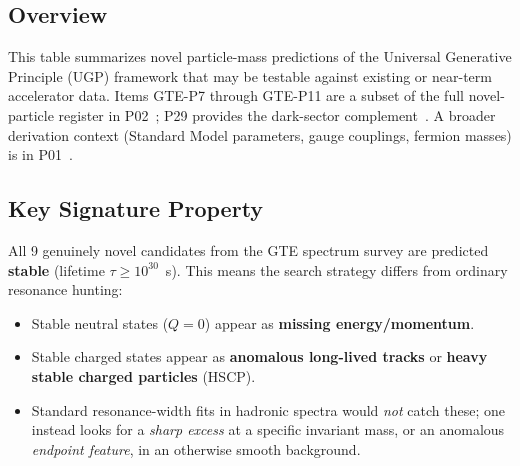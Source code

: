 

\makeatletter
{}
\makeatother

\newcommand{\tOne}{\textcolor{tier1}{\textbf{Tier~1}}}
\newcommand{\tTwo}{\textcolor{tier2}{\textbf{Tier~2}}}
\newcommand{\tThree}{\textcolor{tier3}{\textbf{Tier~3}}}
\providecommand{\MeV}{\,\mathrm{MeV}}
\providecommand{\GeV}{\,\mathrm{GeV}}

\subsection*{Overview}

This table summarizes novel particle-mass predictions of the Universal Generative
Principle (UGP) framework that may be testable against existing or near-term
accelerator data.
Items GTE-P7 through GTE-P11 are a subset of the full novel-particle register in
P02~\cite{SpivackGTESpectrum}; P29 provides the dark-sector complement~\cite{SpivackMirrorBraidAtlas}.
A broader derivation context (Standard Model parameters, gauge couplings, fermion
masses) is in P01~\cite{SpivackSM}.

\subsection*{Key Signature Property}

All 9 genuinely novel candidates from the GTE spectrum survey are predicted
\textbf{stable} (lifetime $\tau \geq 10^{30}$~s).  This means the
search strategy differs from ordinary resonance hunting:

\begin{itemize}[leftmargin=2em,itemsep=2pt]
  \item Stable neutral states ($Q=0$) appear as \textbf{missing energy/momentum}.
  \item Stable charged states appear as \textbf{anomalous long-lived tracks} or
        \textbf{heavy stable charged particles} (HSCP).
  \item Standard resonance-width fits in hadronic spectra would \emph{not} catch
        these; one instead looks for a \emph{sharp excess} at a specific invariant
        mass, or an anomalous \emph{endpoint feature}, in an otherwise smooth
        background.
\end{itemize}

